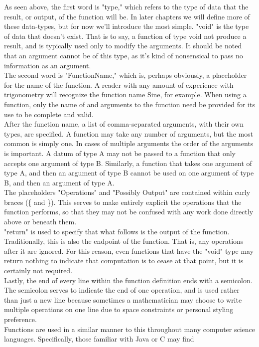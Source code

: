 As seen above, the first word is "type," which refers to the type of data that the result, or output, of the function will be. In later chapters we will define more of these data-types, but for now we'll introduce the most simple.
"void" is the type of data that doesn't exist. That is to say, a function of type void not produce a result, and is typically used only to modify the arguments.
It should be noted that an argument cannot be of this type, as it's kind of nonsensical to pass no information as an argument. \\
The second word is "FunctionName," which is, perhaps obviously, a placeholder for the name of the function. A reader with any amount of experience with trigonometry will recognize the function name Sine, for example. When using a function, only the name of and arguments to the function need be provided for its use to be complete and valid. \\
After the function name, a list of comma-separated arguments, with their own types, are specified. A function may take any number of arguments, but the most common is simply one. In cases of multiple arguments the order of the arguments is important. A datum of type A may not be passed to a function that only accepts one argument of type B. Similarly, a function that takes one argument of type A, and then an argument of type B cannot be used on one argument of type B, and then an argument of type A. \\
The placeholders "Operations" and "Possibly Output" are contained within curly braces (\{ and \}). This serves to make entirely explicit the operations that the function performs, so that they may not be confused with any work done directly above or beneath them. \\
"return" is used to specify that what follows is the output of the function. Traditionally, this is also the endpoint of the function. That is, any operations after it are ignored. For this reason, even functions that have the "void" type may return nothing to indicate that computation is to cease at that point, but it is certainly not required. \\
Lastly, the end of every line within the function definition ends with a semicolon. The semicolon serves to indicate the end of one operation, and is used rather than just a new line because sometimes a mathematician may choose to write multiple operations on one line due to space constraints or personal styling preference. \\
Functions are used in a similar manner to this throughout many computer science languages. Specifically, those familiar with Java or C may find 

